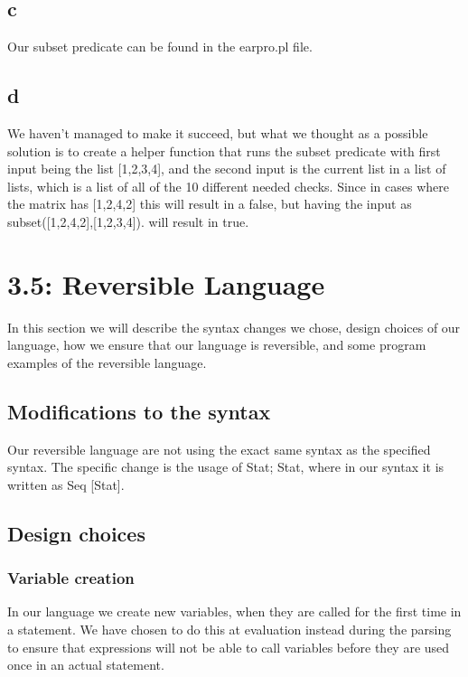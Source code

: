 \documentclass[10pt,a4paper]{article}      %
\begin{document}
\subsection*{c}

Our subset predicate can be found in the earpro.pl file.

\subsection*{d}

We haven't managed to make it succeed, but what we thought as a possible solution is to create a helper function that runs the subset predicate with first input being the list [1,2,3,4], and the second input is the current list in a list of lists, which is a list of all of the 10 different needed checks. Since in cases where the matrix has [1,2,4,2] this will result in a false, but having the input as subset([1,2,4,2],[1,2,3,4]). will result in true.


\section*{3.5: Reversible Language}

In this section we will describe the syntax changes we chose, design choices of our language, how we ensure that our language is reversible, and some program examples of the reversible language.

\subsection*{Modifications to the syntax}

Our reversible language are not using the exact same syntax as the specified syntax. The specific change is the usage of Stat; Stat, where in our syntax it is written as Seq [Stat].

\subsection*{Design choices}

\subsubsection*{Variable creation}

In our language we create new variables, when they are called for the first time in a statement. We have chosen to do this at evaluation instead during the parsing to ensure that expressions will not be able to call variables before they are used once in an actual statement.
\end{document}
